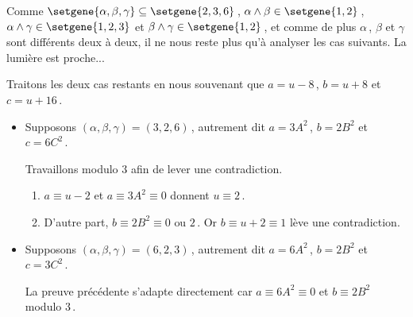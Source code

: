 \medskip
	
Comme
$\setgene{\alpha, \beta, \gamma} \subseteq \setgene{2, 3, 6}$\,,
$\alpha \wedge \beta \in \setgene{1, 2}$\,,
$\alpha \wedge \gamma \in \setgene{1, 2, 3}$ et
$\beta \wedge \gamma \in \setgene{1, 2}$\,,
et comme de plus $\alpha$\,, $\beta$ et $\gamma$ sont différents deux à deux, il ne nous reste plus qu'à analyser les cas suivants.
La lumière est proche...

\begin{center}
\end{center}


Traitons les deux cas restants en nous souvenant que $a = u - 8$\,, $b = u + 8$ et $c = u + 16$\,.
	
\begin{itemize}
	\item Supposons $(\alpha, \beta, \gamma) = (3, 2, 6)$\,, 
	autrement dit 
	$a = 3 A^2$\,, $b = 2 B^2$ et $c = 6 C^2$\,.
		
	\smallskip
	\noindent
	Travaillons modulo $3$ afin de lever une contradiction.
	\begin{enumerate}			
		\item $a \equiv u - 2$ et $a \equiv 3 A^2 \equiv 0$ donnent $u \equiv 2$\,.
			
		\item D'autre part, $b \equiv 2 B^2 \equiv \text{$0$ ou $2$}$\,.
			Or $b \equiv u + 2 \equiv 1$ lève une contradiction.
	\end{enumerate}
		
		
	\item Supposons $(\alpha, \beta, \gamma) = (6, 2, 3)$\,, 
	autrement dit 
	$a = 6 A^2$\,, $b = 2 B^2$ et $c = 3 C^2$\,.
		
	\smallskip
	\noindent
	La preuve précédente s'adapte directement car $a \equiv 6 A^2 \equiv 0$ et $b \equiv 2 B^2$ modulo $3$\,. \qedhere
\end{itemize}